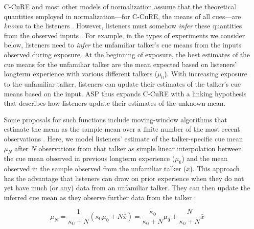 \documentclass[
  11pt,
  man,floatsintext]{apa6}
\begin{document}
C-CuRE and most other models of normalization assume that the theoretical quantities employed in normalization---for C-CuRE, the means of all cues---are \emph{known} to the listeners \autocites[e.g.,][]{apfelbaum-mcmurray2015,mcmurray-jongman2011}. However, listeners must somehow \emph{infer} these quantities from the observed inputs \autocites[see also][]{barreda2012,magnuson-nusbaum2007,weatherholtz-jaeger2016}. For example, in the types of experiments we consider below, listeners need to \emph{infer} the unfamiliar talker's cue means from the inputs observed during exposure. At the beginning of exposure, the best estimates of the cue means for the unfamiliar talker are the mean expected based on listeners' longterm experience with various different talkers (\(\mu_0\)). With increasing exposure to the unfamiliar talker, listeners can update their estimates of the talker's cue means based on the input. ASP thus expands C-CuRE with a linking hypothesis that describes how listeners update their estimates of the unknown mean.

Some proposals for such functions include moving-window algorithms that estimate the mean as the sample mean over a finite number of the most recent observations \autocite{lee2002,zhang-peng2021}. Here, we model listeners' estimate of the talker-specific cue mean \(\mu_N\) after \(N\) observations from that talker as simple linear interpolation between the cue mean observed in previous longterm experience (\(\mu_0\)) and the mean observed in the sample observed from the unfamiliar talker (\(\bar{x}\)). This approach has the advantage that listeners can draw on prior experience when they do not yet have much (or any) data from an unfamiliar talker. They can then update the inferred cue mean as they observe further data from the talker \autocite[see discussion of the flexibility-stability trade-off in][p.~178-182]{kleinschmidt-jaeger2015}:

\begin{equation}\label{eq:normalization-change}
\mu_N = \frac{1}{\kappa_0 + N} \left( \kappa_0 \mu_0 + N \bar{x} \right) = \frac{\kappa_0}{\kappa_0 + N} \mu_0 + \frac{N}{\kappa_0 + N}\bar{x}
\end{equation}
\end{document}
